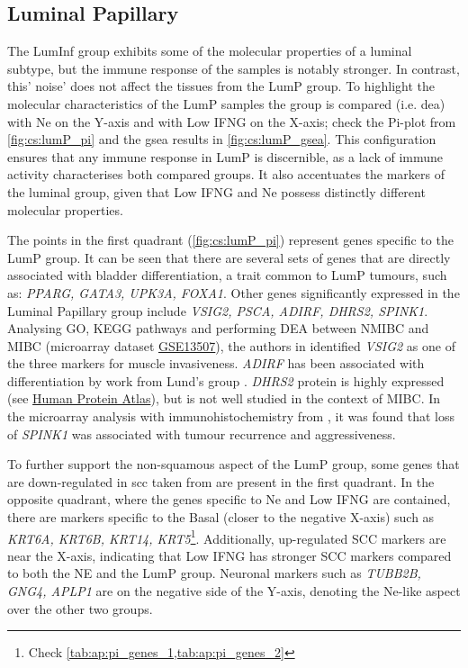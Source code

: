 \subsection{Luminal Papillary} \label{s:cs:lumP_interp}

The LumInf group exhibits some of the molecular properties of a luminal subtype, but the immune response of the samples is notably stronger. In contrast, this' noise' does not affect the tissues from the LumP group. To highlight the molecular characteristics of the LumP samples the group is compared  (i.e. \acrshort{dea}) with Ne on the Y-axis and with Low IFNG on the X-axis; check the Pi-plot from \cref{fig:cs:lumP_pi} and the \acrshort{gsea} results in \cref{fig:cs:lumP_gsea}. This configuration ensures that any immune response in LumP is discernible, as a lack of immune activity characterises both compared groups. It also accentuates the markers of the luminal group, given that Low IFNG and Ne possess distinctly different molecular properties.

The points in the first quadrant (\cref{fig:cs:lumP_pi}) represent genes specific to the LumP group. It can be seen that there are several sets of genes that are directly associated with bladder differentiation, a trait common to LumP tumours, such as: \textit{PPARG, GATA3, UPK3A, FOXA1}. Other genes significantly expressed in the Luminal Papillary group include \textit{VSIG2, PSCA, ADIRF, DHRS2, SPINK1}. Analysing GO, KEGG pathways and performing DEA between NMIBC and MIBC (microarray dataset \href{https://www.ncbi.nlm.nih.gov/geo/query/acc.cgi?acc=GSE13507}{GSE13507}), the authors in \citet{He2021-de} identified \textit{VSIG2} as one of the three markers for muscle invasiveness. \textit{ADIRF} has been associated with differentiation by work from Lund's group \citep{Eriksson2015-lt}. \textit{DHRS2} protein is highly expressed (see \href{https://www.proteinatlas.org/ENSG00000100867-DHRS2/tissue/urinary+bladder}{Human Protein Atlas}), but is not well studied in the context of MIBC. In the microarray analysis with immunohistochemistry from \citet{Rink2013-sv}, it was found that loss of \textit{SPINK1} was associated with tumour recurrence and aggressiveness.

To further support the non-squamous aspect of the LumP group, some genes that are down-regulated in \acrfull{scc} taken from \citet{Knowles2015-mu} are present in the first quadrant. In the opposite quadrant, where the genes specific to Ne and Low IFNG are contained, there are markers specific to the Basal (closer to the negative X-axis) such as \textit{KRT6A, KRT6B, KRT14, KRT5}\footnote{Check \cref{tab:ap:pi_genes_1,tab:ap:pi_genes_2}}. Additionally, up-regulated SCC markers are near the X-axis, indicating that Low IFNG has stronger SCC markers compared to both the NE and the LumP group. Neuronal markers such as \textit{TUBB2B, GNG4, APLP1} are on the negative side of the Y-axis, denoting the Ne-like aspect over the other two groups.

